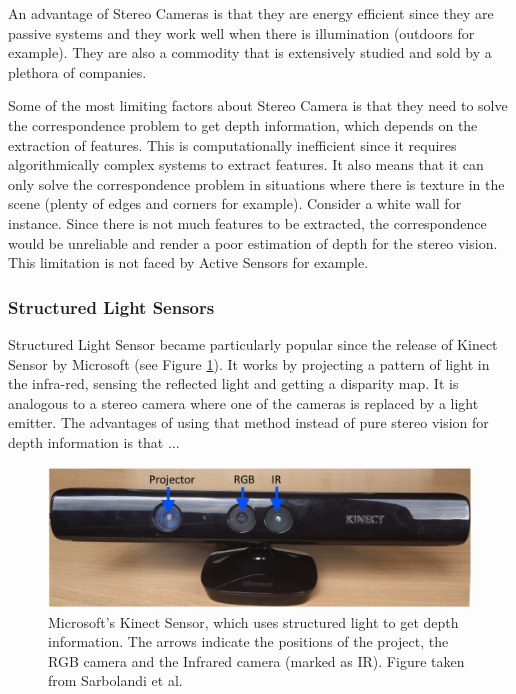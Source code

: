 \documentclass[11pt]{article}
\begin{document}
An advantage of Stereo Cameras is that they are energy efficient since they are passive systems and they work well when there is illumination (outdoors for example). They are also a commodity that is extensively studied and sold by a plethora of companies.

Some of the most limiting factors about Stereo Camera is that they need to solve the correspondence problem to get depth information, which depends on the extraction of features. This is computationally inefficient since it requires algorithmically complex systems to extract features. It also means that it can only solve the correspondence problem in situations where there is texture in the scene (plenty of edges and corners for example). Consider a white wall for instance. Since there is not much features to be extracted, the correspondence would be unreliable and render a poor estimation of depth for the stereo vision. This limitation is not faced by Active Sensors for example.

	\subsubsection{Structured Light Sensors}

Structured Light Sensor became particularly popular since the release of Kinect Sensor by Microsoft (see Figure \ref{fig:KinectSensor}). It works by projecting a pattern of light in the infra-red, sensing the reflected light and getting a disparity map. It is analogous to a stereo camera where one of the cameras is replaced by a light emitter. The advantages of using that method instead of pure stereo vision for depth information is that ...

\begin{figure}
	\begin{minipage}{0.65\textwidth}
		\centering
		\includegraphics[width=\textwidth]{Kinectv1}
	\end{minipage} \hfill
	\begin{minipage}{0.35\textwidth}
		\centering
		\caption{Microsoft's Kinect Sensor, which uses structured light to get depth information. The arrows indicate the positions of the project, the RGB camera and the Infrared camera (marked as IR). Figure taken from Sarbolandi et al. \cite{sarbolandi2015kinect}}
		\label{fig:KinectSensor}
	\end{minipage}				
\end{figure}
\end{document}
